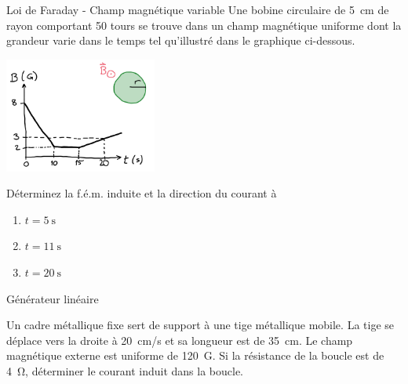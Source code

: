 \documentclass{beamer}
\begin{document}
\begin{frame}{Loi de Faraday - Champ magnétique variable}
  Une bobine circulaire de \SI{5}{\centi\meter} de rayon comportant \num{50}
  tours se trouve dans un champ magnétique uniforme dont la grandeur varie dans
  le temps tel qu'illustré dans le graphique ci-dessous.
  \begin{center}
    \includegraphics[width=5cm]{figures/champ_variable.png}
  \end{center}

  Déterminez la f.é.m. induite et la direction du courant à
  \begin{enumerate}
    \item $t = \SI{5}{\second}$
    \item $t = \SI{11}{\second}$
    \item $t = \SI{20}{\second}$
  \end{enumerate}
\end{frame}


\begin{frame}{Générateur linéaire}

  Un cadre métallique fixe sert de support à une tige métallique mobile. La tige
  se déplace vers la droite à \SI{20}{cm/s} et sa longueur est de \SI{35}{cm}. Le
  champ magnétique externe est uniforme de \SI{120}{G}.
  Si la résistance de la boucle est de \SI{4}{\ohm}, déterminer le courant induit
  dans la boucle.

  \begin{center}
  \end{center}
\end{frame}
\end{document}
